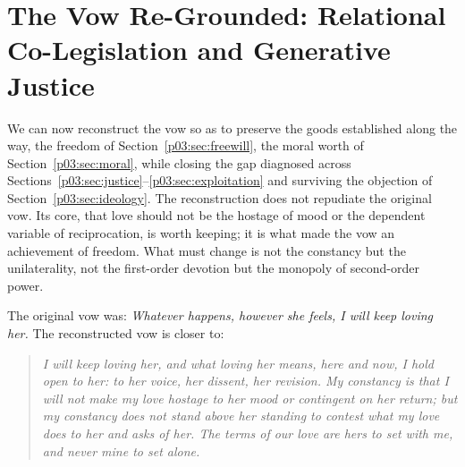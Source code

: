 \documentclass[11pt,a4paper]{article}
\begin{document}
\section{The Vow Re-Grounded: Relational Co-Legislation and Generative Justice}\label{p03:sec:regrounded}

We can now reconstruct the vow so as to preserve the goods established along the way, the freedom of Section~\ref{p03:sec:freewill}, the moral worth of Section~\ref{p03:sec:moral}, while closing the gap diagnosed across Sections~\ref{p03:sec:justice}--\ref{p03:sec:exploitation} and surviving the objection of Section~\ref{p03:sec:ideology}. The reconstruction does not repudiate the original vow. Its core, that love should not be the hostage of mood or the dependent variable of reciprocation, is worth keeping; it is what made the vow an achievement of freedom. What must change is not the constancy but the unilaterality, not the first-order devotion but the monopoly of second-order power.

The original vow was: \emph{Whatever happens, however she feels, I will keep loving her.} The reconstructed vow is closer to:

\begin{quote}\itshape
I will keep loving her, and what loving her means, here and now, I hold open to her: to her voice, her dissent, her revision. My constancy is that I will not make my love hostage to her mood or contingent on her return; but my constancy does not stand above her standing to contest what my love does to her and asks of her. The terms of our love are hers to set with me, and never mine to set alone.
\end{quote}
\end{document}
